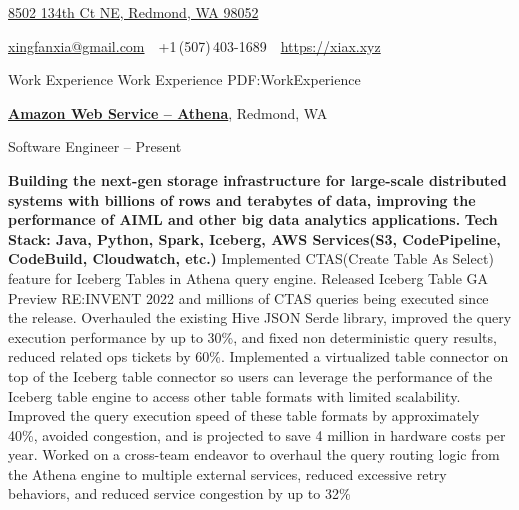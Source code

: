 \documentclass[a4paper,MMMyyyy,nonstopmode]{simpleresumecv}
\newcommand{\CVAuthor}{Xingfan Xia}
\newcommand{\CVWebpage}{https://xiax.xyz}
\begin{document}

\Title{\CVAuthor}

\begin{SubTitle}
\href{https://www.google.com/maps/place/8502+134th+Ct+NE,+Redmond,+WA+98052}
{8502 134th Ct NE, Redmond, WA 98052}
\par
\href{mailto:xingfanxia@gmail.com}
{xingfanxia@gmail.com}
\,\SubBulletSymbol\,
+1\,(507)\,403-1689
\,\SubBulletSymbol\,
\href{\CVWebpage}
{\url{\CVWebpage}}
\end{SubTitle}

\begin{Body}

\Section
{Work\newline
Experience}
{Work Experience}
{PDF:WorkExperience}

\Entry
\href{https://aws.amazon.com/athena/}
{\textbf{Amazon Web Service -- Athena}},
Redmond, WA

\Gap
\BulletItem
Software Engineer
\hfill
{} --
Present
\begin{Detail}
\SubBulletItem
\textbf{Building the next-gen storage infrastructure for large-scale distributed systems with billions of rows and terabytes of data, improving the performance of AIML and other big data analytics applications.}
\SubBulletItem \textbf{Tech Stack: Java, Python, Spark, Iceberg, AWS Services(S3, CodePipeline, CodeBuild, Cloudwatch, etc.)}
\SubBulletItem
Implemented CTAS(Create Table As Select) feature for Iceberg Tables in Athena query engine. Released Iceberg Table GA Preview RE:INVENT 2022 and millions of CTAS queries being executed since the release.
\SubBulletItem
Overhauled the existing Hive JSON Serde library, improved the query execution performance by up to 30\%, and fixed non deterministic query results, reduced related ops tickets by 60\%.
\SubBulletItem
Implemented a virtualized table connector on top of the Iceberg table connector so users can leverage the performance of the Iceberg table engine to access other table formats with limited scalability. 
Improved the query execution speed of these table formats by approximately 40\%, avoided congestion, and is projected to save 4 million in hardware costs per year.
\SubBulletItem
Worked on a cross-team endeavor to overhaul the query routing logic from the Athena engine to multiple external services, reduced excessive retry behaviors, and reduced service congestion by up to 32\%
\end{Detail}


\end{Body}
\end{document}
